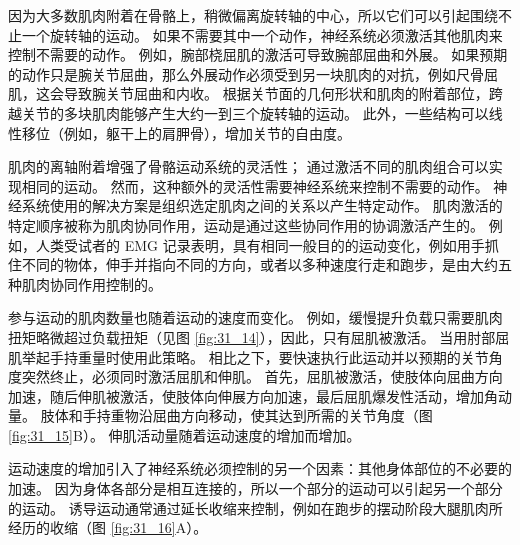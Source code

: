 因为大多数肌肉附着在骨骼上，稍微偏离旋转轴的中心，所以它们可以引起围绕不止一个旋转轴的运动。 如果不需要其中一个动作，神经系统必须激活其他肌肉来控制不需要的动作。 例如，腕部桡屈肌的激活可导致腕部屈曲和外展。 如果预期的动作只是腕关节屈曲，那么外展动作必须受到另一块肌肉的对抗，例如尺骨屈肌，这会导致腕关节屈曲和内收。 根据关节面的几何形状和肌肉的附着部位，跨越关节的多块肌肉能够产生大约一到三个旋转轴的运动。 此外，一些结构可以线性移位（例如，躯干上的肩胛骨），增加关节的自由度。

肌肉的离轴附着增强了骨骼运动系统的灵活性； 通过激活不同的肌肉组合可以实现相同的运动。 然而，这种额外的灵活性需要神经系统来控制不需要的动作。 神经系统使用的解决方案是组织选定肌肉之间的关系以产生特定动作。 肌肉激活的特定顺序被称为肌肉协同作用，运动是通过这些协同作用的协调激活产生的。 例如，人类受试者的 EMG 记录表明，具有相同一般目的的运动变化，例如用手抓住不同的物体，伸手并指向不同的方向，或者以多种速度行走和跑步，是由大约五种肌肉协同作用控制的。

参与运动的肌肉数量也随着运动的速度而变化。 例如，缓慢提升负载只需要肌肉扭矩略微超过负载扭矩（见图 \ref{fig:31_14}），因此，只有屈肌被激活。 当用肘部屈肌举起手持重量时使用此策略。 相比之下，要快速执行此运动并以预期的关节角度突然终止，必须同时激活屈肌和伸肌。 首先，屈肌被激活，使肢体向屈曲方向加速，随后伸肌被激活，使肢体向伸展方向加速，最后屈肌爆发性活动，增加角动量。 
肢体和手持重物沿屈曲方向移动，使其达到所需的关节角度（图 \ref{fig:31_15}B）。 
伸肌活动量随着运动速度的增加而增加。

运动速度的增加引入了神经系统必须控制的另一个因素：其他身体部位的不必要的加速。 因为身体各部分是相互连接的，所以一个部分的运动可以引起另一个部分的运动。 
诱导运动通常通过延长收缩来控制，例如在跑步的摆动阶段大腿肌肉所经历的收缩（图 \ref{fig:31_16}A）。

